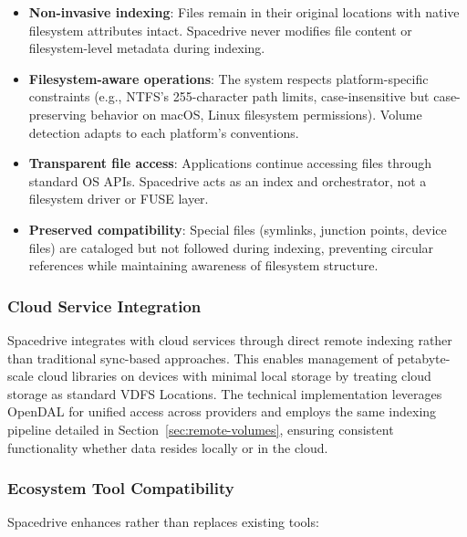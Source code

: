 \documentclass[sigconf]{acmart}
\begin{document}
\begin{itemize}[noitemsep, topsep=0pt]
 \item \textbf{Non-invasive indexing}: Files remain in their original locations with native filesystem attributes intact. Spacedrive never modifies file content or filesystem-level metadata during indexing.

 \item \textbf{Filesystem-aware operations}: The system respects platform-specific constraints (e.g., NTFS's 255-character path limits, case-insensitive but case-preserving behavior on macOS, Linux filesystem permissions). Volume detection adapts to each platform's conventions.

 \item \textbf{Transparent file access}: Applications continue accessing files through standard OS APIs. Spacedrive acts as an index and orchestrator, not a filesystem driver or FUSE layer.

 \item \textbf{Preserved compatibility}: Special files (symlinks, junction points, device files) are cataloged but not followed during indexing, preventing circular references while maintaining awareness of filesystem structure.
\end{itemize}

\subsubsection{Cloud Service Integration}

Spacedrive integrates with cloud services through direct remote indexing rather than traditional sync-based approaches. This enables management of petabyte-scale cloud libraries on devices with minimal local storage by treating cloud storage as standard VDFS Locations. The technical implementation leverages OpenDAL for unified access across providers and employs the same indexing pipeline detailed in Section~\ref{sec:remote-volumes}, ensuring consistent functionality whether data resides locally or in the cloud.

\subsubsection{Ecosystem Tool Compatibility}
Spacedrive enhances rather than replaces existing tools:
\end{document}
